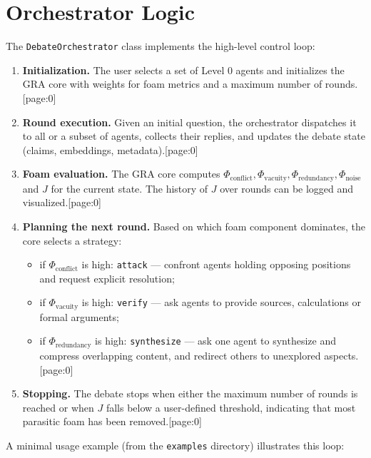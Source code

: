 \documentclass[11pt]{article}
\begin{document}
\section{Orchestrator Logic}

The \texttt{DebateOrchestrator} class implements the high-level control loop:

\begin{enumerate}[leftmargin=1.5em]
\item \textbf{Initialization.}
The user selects a set of Level 0 agents and initializes the GRA core with weights for foam metrics and a maximum number of rounds.[page:0]

\item \textbf{Round execution.}
Given an initial question, the orchestrator dispatches it to all or a subset of agents, collects their replies, and updates the debate state (claims, embeddings, metadata).[page:0]

\item \textbf{Foam evaluation.}
The GRA core computes \(\Phi_{\text{conflict}}, \Phi_{\text{vacuity}}, \Phi_{\text{redundancy}}, \Phi_{\text{noise}}\) and \(J\) for the current state.
The history of \(J\) over rounds can be logged and visualized.[page:0]

\item \textbf{Planning the next round.}
Based on which foam component dominates, the core selects a strategy:
\begin{itemize}[leftmargin=1em]
\item if \(\Phi_{\text{conflict}}\) is high: \texttt{attack} --- confront agents holding opposing positions and request explicit resolution;
\item if \(\Phi_{\text{vacuity}}\) is high: \texttt{verify} --- ask agents to provide sources, calculations or formal arguments;
\item if \(\Phi_{\text{redundancy}}\) is high: \texttt{synthesize} --- ask one agent to synthesize and compress overlapping content, and redirect others to unexplored aspects.[page:0]
\end{itemize}

\item \textbf{Stopping.}
The debate stops when either the maximum number of rounds is reached or when \(J\) falls below a user-defined threshold, indicating that most parasitic foam has been removed.[page:0]
\end{enumerate}

A minimal usage example (from the \texttt{examples} directory) illustrates this loop:
\end{document}
